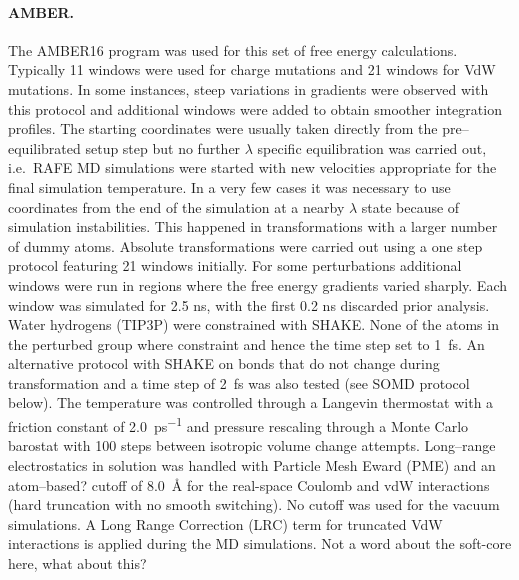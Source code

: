 \documentclass[journal=jctcce,manuscript=article]{achemso}
\begin{document}
%
{\color{blue}
\paragraph{AMBER.} 
The AMBER16 program was used for this set of free energy calculations.  
%
Typically 11 windows were used for charge mutations and 21 windows for VdW mutations. 
In some instances, steep variations in gradients were observed with this protocol and additional windows were added to obtain smoother integration profiles. 
The starting coordinates were usually taken directly from the pre--equilibrated setup step but no further $\lambda$ specific equilibration  was carried out, 
i.e.\ RAFE MD simulations were started with new velocities appropriate for the final simulation temperature.  
In a very few cases it was necessary to use coordinates from the end of the simulation at a nearby $\lambda$ state because of simulation instabilities. 
This happened in transformations with a larger number of dummy atoms.  
Absolute transformations were carried out using a one step protocol featuring 21 windows initially. 
For some perturbations additional windows were run in regions where the free energy gradients varied sharply. 
Each window was simulated for 2.5 ns, with the first 0.2 ns discarded prior analysis.
%
Water hydrogens (TIP3P) were constrained with SHAKE. 
None of the atoms in the perturbed group where constraint and hence the time step set to \SI{1}{fs}.  
An alternative protocol with SHAKE on bonds that do not change during transformation and a time step of \SI{2}{fs} was also tested (see SOMD protocol below). 
%
The temperature was controlled through a Langevin thermostat with a friction constant of \SI{2.0}{ps^{-1}} and pressure 
rescaling through a Monte Carlo barostat with 100 steps between isotropic volume change attempts.  
%
Long--range electrostatics in solution was handled with Particle Mesh Eward (PME) and an {\color{red} atom--based? } cutoff 
of \SI{8.0}{\angstrom} for the real-space Coulomb and vdW interactions {\color{red} (hard truncation with no smooth switching)}.
No cutoff was used for the vacuum simulations. 
%
A Long Range Correction (LRC) term for truncated VdW interactions is applied during the MD simulations. 
%
{\color{red} Not a word about the soft-core here, what about this? }



}
\end{document}
